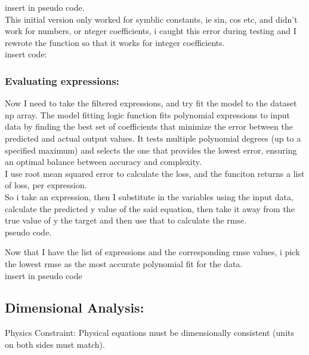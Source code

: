 \documentclass{article}
\begin{document}
insert in pseudo code.\\

This initial version only worked for symblic constants, ie sin, cos etc, and didn't work for numbers, or nteger coefficients, i caught this error during testing and I rewrote the function so that it works for integer coefficients.\\ 

insert code:\\

\subsubsection{Evaluating expressions: }

Now I need to take the filtered expressions, and try fit the model to the dataset np array. The model fitting logic function fits polynomial expressions to input data by finding the best set of coefficients that minimize the error between the predicted and actual output values. It tests multiple polynomial degrees (up to a specified maximum) and selects the one that provides the lowest error, ensuring an optimal balance between accuracy and complexity.\\

I use root mean squared error to calculate the loss, and the funciton returns a list of loss, per expression.\\ 

So i take an expression, then I substitute in the variables using the input data, calculate the predicted y value of the said equation, then take it away from the true value of y the target and then use that to calculate the rmse.\\

pseudo code. \\


Now that I have the list of expressions and the corresponding rmse values, i pick the lowest rmse as the most accurate polynomial fit for the data. \\

insert in pseudo code\\

\subsection{Dimensional Analysis: }

    Physics Constraint: Physical equations must be dimensionally consistent (units on both sides must match).
\end{document}
